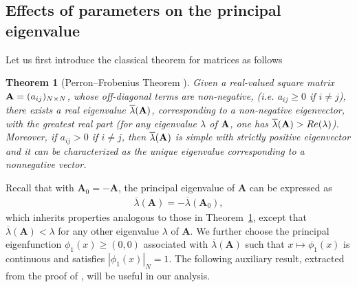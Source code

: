 \documentclass[a4paper,11pt]{amsart}
\newtheorem{theorem}{Theorem}
\newtheorem{remark}{Remark}
\theoremstyle{definition}
\numberwithin{equation}{section}
\theoremstyle{definition}
\begin{document}
\subsection{\bf Effects of parameters on the principal eigenvalue}

Let us first introduce the classical theorem for matrices as follows 
\begin{theorem}[Perron–Frobenius Theorem \cite{gantmacher_theory_1959}]\label{Matrixtheo}
Given a real-valued square matrix ${\bf A}=(a_{ij})_{N\times N }$, whose off-diagonal terms are non-negative, (i.e. $a_{ij} \geq 0$ if $i\neq j$), there exists a real eigenvalue $\overline{\lambda}({\bf A})$, corresponding to a non-negative eigenvector, with the greatest real part (for any eigenvalue $\lambda$ of ${\bf A}$, one has $\overline{\lambda}({\bf A})>Re( \lambda)$). Moreover, if $a_{ij} > 0$ if $i\neq j$, then $\overline{\lambda}({\bf A})$ is simple with strictly positive eigenvector and it can be characterized as the unique eigenvalue corresponding to a nonnegative vector.
\end{theorem}

Recall that with $\mathbf{A}_0 = -\mathbf{A}$, the principal eigenvalue of $\mathbf{A}$ can be expressed as
\begin{align*}
\overline{\lambda}(\mathbf{A}) = -\overline{\lambda}(\mathbf{A}_0),
\end{align*}
which inherits properties analogous to those in Theorem~\ref{Matrixtheo}, except that $\overline{\lambda}(\mathbf{A}) < \lambda$ for any other eigenvalue $\lambda$ of $\mathbf{A}$. We further choose the principal eigenfunction $\phi_1(x) \geq (0,0)$ associated with $\overline{\lambda}(\mathbf{A})$ such that $x \mapsto \phi_1(x)$ is continuous and satisfies $|\phi_1(x)|_N = 1$.
%
%
%
%
The following auxiliary result, extracted from the proof of \cite[Lemma~4.3]{lam_ays_2016}, will be useful in our analysis.
\end{document}
